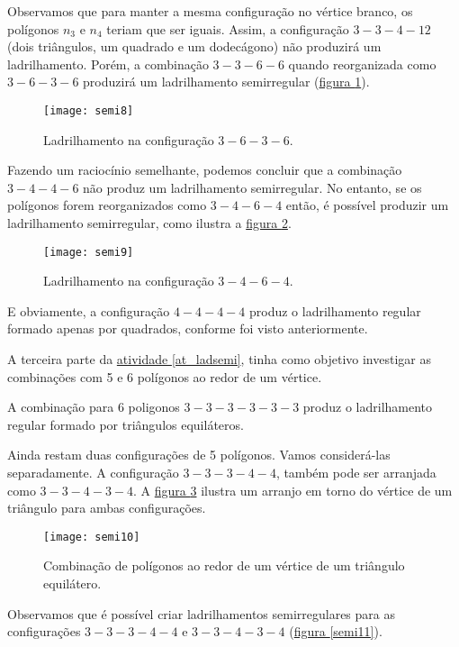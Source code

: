 Observamos que para manter a mesma configuração no vértice branco, os polígonos $n_3$  e $n_4$ teriam que ser iguais. Assim, a configuração $3-3-4-12$ (dois triângulos, um quadrado e um dodecágono) não produzirá um ladrilhamento. Porém, a combinação $3-3-6-6$ quando reorganizada como $3-6-3-6$ produzirá um ladrilhamento semirregular (\hyperref[semi8]{figura \ref{semi8}}).



\begin{figure}[H]
\centering
\texttt{[image: semi8]}
\caption{Ladrilhamento na configuração $3-6-3-6$.}
\label{semi8}
\end{figure}

Fazendo um raciocínio semelhante, podemos concluir que a combinação $3-4-4-6$ não produz um ladrilhamento semirregular. No entanto, se os polígonos forem reorganizados como $3-4-6-4$ então, é possível produzir um ladrilhamento semirregular, como ilustra a \hyperref[semi9]{figura \ref{semi9}}.

\begin{figure}[H]
\centering
\texttt{[image: semi9]}
\caption{Ladrilhamento na configuração $3-4-6-4$.}
\label{semi9}
\end{figure}


E obviamente, a configuração $4-4-4-4$ produz o ladrilhamento regular formado apenas por quadrados, conforme foi visto anteriormente.

A terceira parte da \hyperref[at_ladsemi]{atividade \ref{at_ladsemi}}, tinha como objetivo investigar as combinações com 5 e 6 polígonos ao redor de um vértice.

A combinação para 6 poligonos $3-3-3-3-3-3$ produz o ladrilhamento regular formado por triângulos equiláteros.

Ainda restam duas configurações de 5 polígonos. Vamos  considerá-las separadamente. A configuração $3-3-3-4-4$, também pode ser arranjada como  $3-3- 4-3-4$. A \hyperref[semi10]{figura \ref{semi10}} ilustra um arranjo em torno do vértice de um triângulo para ambas configurações.

\begin{figure}[H]
\centering
\texttt{[image: semi10]}
\caption{Combinação de polígonos ao redor de um vértice de um triângulo equilátero.}
\label{semi10}
\end{figure}

Observamos que é possível criar ladrilhamentos semirregulares para as configurações  $3-3-3-4-4$ e $3-3-4-3-4$ (\hyperref[semi11]{figura \ref{semi11}}).

